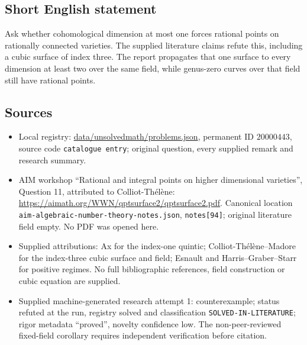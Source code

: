 \documentclass[11pt]{article}
\begin{document}
\subsection{Short English statement}
Ask whether cohomological dimension at most one forces rational points on rationally connected varieties. The supplied literature claims refute this, including a cubic surface of index three. The report propagates that one surface to every dimension at least two over the same field, while genus-zero curves over that field still have rational points.
\subsection{Sources}
\begin{itemize}
\item Local registry: \url{data/unsolvedmath/problems.json}, permanent ID $20000443$, source code \texttt{catalogue entry}; original question, every supplied remark and research summary.
\item AIM workshop ``Rational and integral points on higher dimensional varieties'', Question 11, attributed to Colliot-Th\'el\`ene: \url{https://aimath.org/WWN/qptsurface2/qptsurface2.pdf}. Canonical location \texttt{aim-algebraic-number-theory-notes.json}, \texttt{notes[94]}; original literature field empty. No PDF was opened here.
\item Supplied attributions: Ax for the index-one quintic; Colliot-Th\'el\`ene--Madore for the index-three cubic surface and field; Esnault and Harris--Graber--Starr for positive regimes. No full bibliographic references, field construction or cubic equation are supplied.
\item Supplied machine-generated research attempt 1: counterexample; status refuted at the run, registry solved and classification \texttt{SOLVED-IN-LITERATURE}; rigor metadata ``proved'', novelty confidence low. The non-peer-reviewed fixed-field corollary requires independent verification before citation.
\end{itemize}
\end{document}
